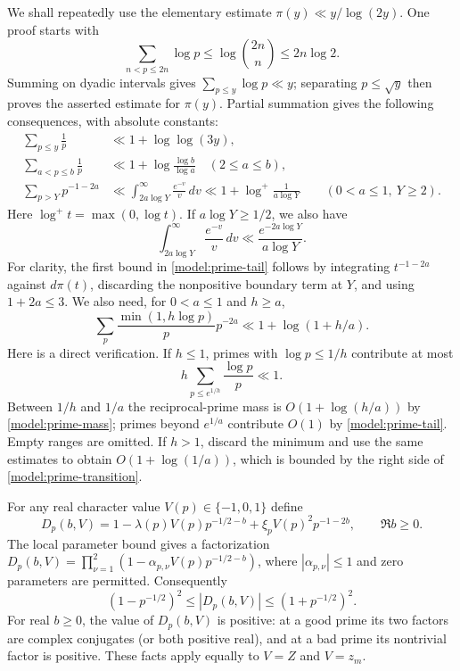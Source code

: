 We shall repeatedly use the elementary estimate
$\pi(y)\ll y/\log(2y)$.  One proof starts with
\[
 \sum_{n<p\le2n}\log p\le\log\binom{2n}{n}\le2n\log2.
\]
Summing on dyadic intervals gives $\sum_{p\le y}\log p\ll y$;
separating $p\le\sqrt y$ then proves the asserted estimate for $\pi(y)$.
Partial summation gives the following consequences, with absolute
constants:
\begin{align}
 \sum_{p\le y}\frac1p&\ll1+\log\log(3y),\nonumber\\
 \sum_{a<p\le b}\frac1p&\ll
 1+\log\frac{\log b}{\log a}\quad(2\le a\le b),
 \label{model:prime-mass}\\
 \sum_{p>Y}p^{-1-2a}
 &\ll\int_{2a\log Y}^{\infty}\frac{e^{-v}}v\,dv
 \ll 1+\log^+\frac1{a\log Y}\qquad(0<a\le1,\ Y\ge2).
 \label{model:prime-tail}
\end{align}
Here $\log^+t=\max(0,\log t)$.  If $a\log Y\ge1/2$, we also have
\[
 \int_{2a\log Y}^{\infty}\frac{e^{-v}}v\,dv
 \ll\frac{e^{-2a\log Y}}{a\log Y}.
\]
For clarity, the first bound in \eqref{model:prime-tail} follows by
integrating $t^{-1-2a}$ against $d\pi(t)$, discarding the nonpositive
boundary term at $Y$, and using $1+2a\le3$.
We also need, for $0<a\le1$ and $h\ge a$,
\begin{equation}
 \sum_p\frac{\min(1,h\log p)}p p^{-2a}
 \ll 1+\log(1+h/a).
 \label{model:prime-transition}
\end{equation}
Here is a direct verification.  If $h\le1$, primes with
$\log p\le1/h$ contribute at most
\[
 h\sum_{p\le e^{1/h}}\frac{\log p}{p}\ll1.
\]
Between $1/h$ and $1/a$ the reciprocal-prime mass is
$O(1+\log(h/a))$ by \eqref{model:prime-mass}; primes beyond $e^{1/a}$
contribute $O(1)$ by \eqref{model:prime-tail}.  Empty ranges are omitted.
If $h>1$, discard the minimum and use the same estimates to obtain
$O(1+\log(1/a))$, which is bounded by the right side of
\eqref{model:prime-transition}.

For any real character value $V(p)\in\{-1,0,1\}$ define
\begin{equation}
 D_p(b,V)=1-\lambda(p)V(p)p^{-1/2-b}
                +\xi_p V(p)^2p^{-1-2b},\qquad \Re b\ge0.
 \label{model:inverse-local}
\end{equation}
The local parameter bound gives a factorization
$D_p(b,V)=\prod_{\nu=1}^2(1-\alpha_{p,\nu}V(p)p^{-1/2-b})$,
where $|\alpha_{p,\nu}|\le1$ and zero parameters are permitted.
Consequently
\begin{equation}
 (1-p^{-1/2})^2\le |D_p(b,V)|\le(1+p^{-1/2})^2.
 \label{model:local-bounds}
\end{equation}
For real $b\ge0$, the value of $D_p(b,V)$ is positive: at a good
prime its two factors are complex conjugates (or both positive real),
and at a bad prime its nontrivial factor is positive.  These facts apply
equally to $V=Z$ and $V=z_m$.

